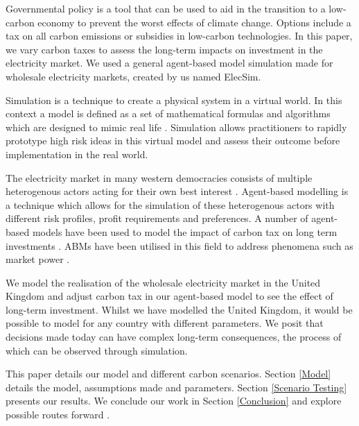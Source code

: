 
Governmental policy is a tool that can be used to aid in the transition to a low-carbon economy to prevent the worst effects of climate change. Options include a tax on all carbon emissions or subsidies in low-carbon technologies. In this paper, we vary carbon taxes to assess the long-term impacts on investment in the electricity market. We used a general agent-based model simulation made for wholesale electricity markets, created by us named ElecSim. 


Simulation is a technique to create a physical system in a virtual world.  In this context a model is defined as a set of mathematical formulas and algorithms which are designed to mimic real life \cite{Forshaw2016}. Simulation allows practitioners to rapidly prototype high risk ideas in this virtual model and assess their outcome before implementation in the real world.

The electricity market in many western democracies consists of multiple heterogenous actors acting for their own best interest \cite{Most2010}. Agent-based modelling is a technique which allows for the simulation of these heterogenous actors with different risk profiles, profit requirements and preferences. A number of agent-based models have been used to model the impact of carbon tax on long term investments \cite{Tang2015, Chen2014, Chappin2017}. ABMs have been utilised in this field to address phenomena such as market power \cite{Ringler2016a}.

We model the realisation of the wholesale electricity market in the United Kingdom and adjust carbon tax in our agent-based model to see the effect of long-term investment. Whilst we have modelled the United Kingdom, it would be possible to model for any country with different parameters. We posit that decisions made today can have complex long-term consequences, the process of which can be observed through simulation.



This paper details our model and different carbon scenarios. Section \ref{Model} details the model, assumptions made and parameters. Section \ref{Scenario Testing} presents our results. We conclude our work in Section \ref{Conclusion} and explore possible routes forward .


